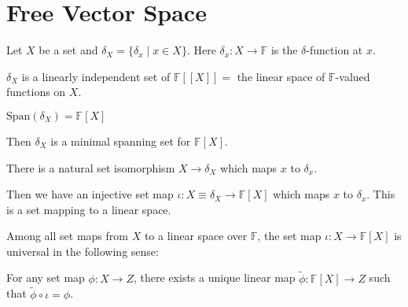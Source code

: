 \documentclass[
	11pt, %
	fleqn, %
	a4paper, %
]{LegrandOrangeBook}
\renewcommand{\span}[1]{\text{Span}(#1)} %
\newcommand{\F}{\mathbb{F}} %
\begin{document}
\begin{center}
\end{center}

\newpage

\section{Free Vector Space}

Let $X$ be a set and $\delta_X = \{ \delta_x \mid x \in X \}$. Here $\delta_x : X \to \F$ is the $\delta$-function at $x$. 

\begin{proposition}
    $\delta_X$ is a linearly independent set of $\F[[X]] =$ the linear space of $\F$-valued functions on $X$.
\end{proposition}

\begin{proposition}
    $\span{\delta_X} = \F[X]$
\end{proposition}

Then $\delta_X$ is a minimal spanning set for $\F[X]$.

\begin{proposition}
    There is a natural set isomorphism $X \to \delta_X$ which maps $x$ to $\delta_x$.
\end{proposition}

Then we have an injective set map $\iota : X \equiv \delta_X \to \F[X]$ which maps $x$ to $\delta_x$. This is a set mapping to a linear space.

Among all set maps from $X$ to a linear space over $\F$, the set map $\iota : X \to \F[X]$ is universal in the following sense:
\begin{center}
\end{center}
For any set map $\phi : X \to Z$, there exists a unique linear map $\tilde{\phi} : \F[X] \to Z$ such that $\tilde{\phi} \circ \iota = \phi$.
\end{document}
